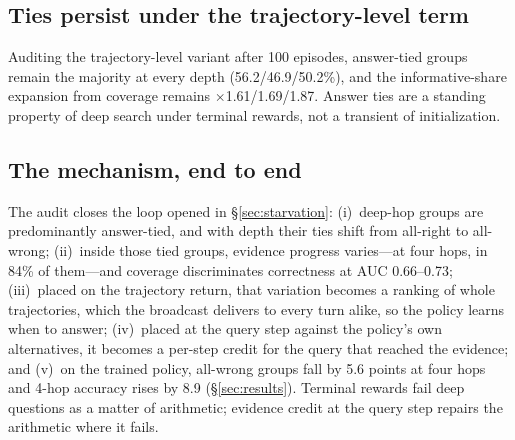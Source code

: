 \subsection{Ties persist under the trajectory-level term}
\label{sec:mech-evolution}

Auditing the trajectory-level variant after 100 episodes, answer-tied
groups remain the majority at every depth (56.2/46.9/50.2\%), and the
informative-share expansion from coverage remains
$\times$1.61/1.69/1.87. Answer ties are a standing property of deep
search under terminal rewards, not a transient of initialization.

\subsection{The mechanism, end to end}
\label{sec:mech-chain}

The audit closes the loop opened in \S\ref{sec:starvation}:
(i)~deep-hop groups are predominantly answer-tied, and with depth their
ties shift from all-right to all-wrong;
(ii)~inside those tied groups, evidence progress varies---at four hops,
in 84\% of them---and coverage discriminates correctness at AUC
0.66--0.73;
(iii)~placed on the trajectory return, that variation becomes a
ranking of whole trajectories, which the broadcast delivers to every
turn alike, so the policy learns when to answer;
(iv)~placed at the query step against the policy's own alternatives,
it becomes a per-step credit for the query that reached the evidence;
and (v)~on the trained policy, all-wrong groups fall by 5.6 points at
four hops and 4-hop accuracy rises by 8.9 (\S\ref{sec:results}).
Terminal rewards fail deep questions as a matter of arithmetic;
evidence credit at the query step repairs the arithmetic where it
fails.
